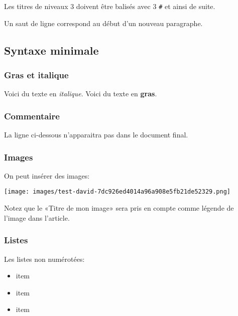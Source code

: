 \documentclass[12pt,french,letterpaper]{article}
\let\origfigure=\figure
\let\endorigfigure=\endfigure
\renewenvironment{figure}[1][]{%
  \origfigure[H]
}{%
  \endorigfigure
}
\providecommand{\tightlist}{%
  \setlength{\itemsep}{0pt}\setlength{\parskip}{0pt}}
\begin{document}
Les titres de niveaux 3 doivent être balisés avec 3 \texttt{\#} et ainsi
de suite.

Un saut de ligne correspond au début d'un nouveau paragraphe.

\hypertarget{syntaxe-minimale}{%
\subsection{Syntaxe minimale}\label{syntaxe-minimale}}

\hypertarget{gras-et-italique}{%
\subsubsection{Gras et italique}\label{gras-et-italique}}

Voici du texte en \emph{italique}. Voici du texte en \textbf{gras}.

\hypertarget{commentaire}{%
\subsubsection{Commentaire}\label{commentaire}}

La ligne ci-dessous n'apparaitra pas dans le document final.

\hypertarget{images}{%
\subsubsection{Images}\label{images}}

On peut insérer des images:

\begin{figure}
\centering
\texttt{[image: images/test-david-7dc926ed4014a96a908e5fb21de52329.png]}
\caption{Titre de mon image}
\end{figure}

Notez que le «Titre de mon image» sera pris en compte comme légende de
l'image dans l'article.

\hypertarget{listes}{%
\subsubsection{Listes}\label{listes}}

Les listes non numérotées:

\begin{itemize}
\tightlist
\item
  item
\item
  item
\item
  item
\end{itemize}
\end{document}
